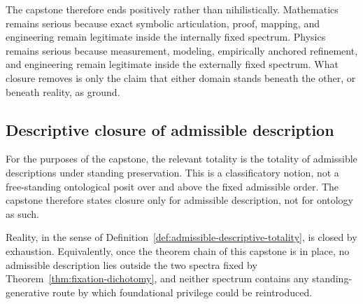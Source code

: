 \begin{remark}
The capstone therefore ends positively rather than nihilistically. Mathematics remains serious because exact symbolic articulation, proof, mapping, and engineering remain legitimate inside the internally fixed spectrum. Physics remains serious because measurement, modeling, empirically anchored refinement, and engineering remain legitimate inside the externally fixed spectrum. What closure removes is only the claim that either domain stands beneath the other, or beneath reality, as ground.
\end{remark}

\subsection{Descriptive closure of admissible description}

\begin{definition}
\label{def:admissible-descriptive-totality}
For the purposes of the capstone, the relevant totality is the totality of admissible descriptions under standing preservation. This is a classificatory notion, not a free-standing ontological posit over and above the fixed admissible order. The capstone therefore states closure only for admissible description, not for ontology as such.
\end{definition}

\begin{theorem}
\label{thm:reality-closure}
Reality, in the sense of Definition~\ref{def:admissible-descriptive-totality}, is closed by exhaustion. Equivalently, once the theorem chain of this capstone is in place, no admissible description lies outside the two spectra fixed by Theorem~\ref{thm:fixation-dichotomy}, and neither spectrum contains any standing-generative route by which foundational privilege could be reintroduced.
\end{theorem}

